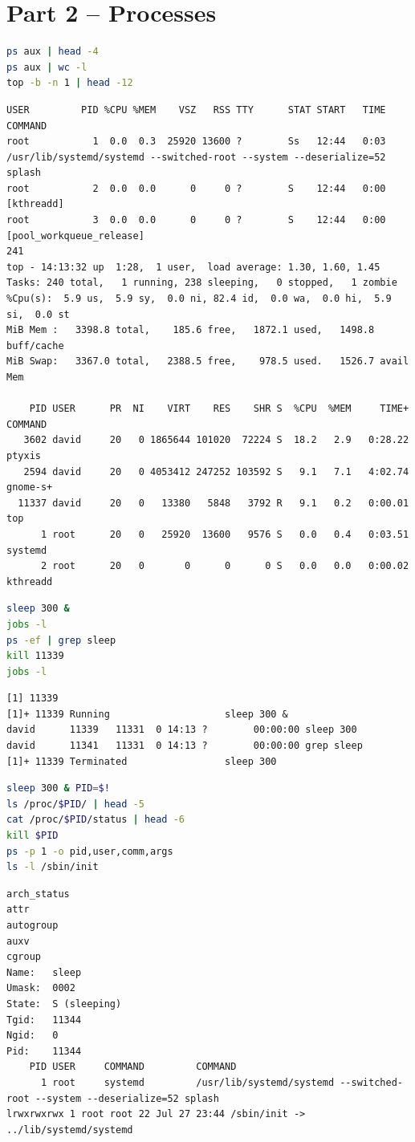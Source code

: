 \documentclass[12pt]{article}
\begin{document}
\section*{Part 2 -- Processes}
\begin{lstlisting}[language=bash]
ps aux | head -4
ps aux | wc -l
top -b -n 1 | head -12
\end{lstlisting}
\begin{lstlisting}
USER         PID %CPU %MEM    VSZ   RSS TTY      STAT START   TIME COMMAND
root           1  0.0  0.3  25920 13600 ?        Ss   12:44   0:03 /usr/lib/systemd/systemd --switched-root --system --deserialize=52 splash
root           2  0.0  0.0      0     0 ?        S    12:44   0:00 [kthreadd]
root           3  0.0  0.0      0     0 ?        S    12:44   0:00 [pool_workqueue_release]
241
top - 14:13:32 up  1:28,  1 user,  load average: 1.30, 1.60, 1.45
Tasks: 240 total,   1 running, 238 sleeping,   0 stopped,   1 zombie
%Cpu(s):  5.9 us,  5.9 sy,  0.0 ni, 82.4 id,  0.0 wa,  0.0 hi,  5.9 si,  0.0 st
MiB Mem :   3398.8 total,    185.6 free,   1872.1 used,   1498.8 buff/cache
MiB Swap:   3367.0 total,   2388.5 free,    978.5 used.   1526.7 avail Mem

    PID USER      PR  NI    VIRT    RES    SHR S  %CPU  %MEM     TIME+ COMMAND
   3602 david     20   0 1865644 101020  72224 S  18.2   2.9   0:28.22 ptyxis
   2594 david     20   0 4053412 247252 103592 S   9.1   7.1   4:02.74 gnome-s+
  11337 david     20   0   13380   5848   3792 R   9.1   0.2   0:00.01 top
      1 root      20   0   25920  13600   9576 S   0.0   0.4   0:03.51 systemd
      2 root      20   0       0      0      0 S   0.0   0.0   0:00.02 kthreadd
\end{lstlisting}

\begin{lstlisting}[language=bash]
sleep 300 &
jobs -l
ps -ef | grep sleep
kill 11339
jobs -l
\end{lstlisting}
\begin{lstlisting}
[1] 11339
[1]+ 11339 Running                    sleep 300 &
david      11339   11331  0 14:13 ?        00:00:00 sleep 300
david      11341   11331  0 14:13 ?        00:00:00 grep sleep
[1]+ 11339 Terminated                 sleep 300
\end{lstlisting}

\begin{lstlisting}[language=bash]
sleep 300 & PID=$!
ls /proc/$PID/ | head -5
cat /proc/$PID/status | head -6
kill $PID
ps -p 1 -o pid,user,comm,args
ls -l /sbin/init
\end{lstlisting}
\begin{lstlisting}
arch_status
attr
autogroup
auxv
cgroup
Name:	sleep
Umask:	0002
State:	S (sleeping)
Tgid:	11344
Ngid:	0
Pid:	11344
    PID USER     COMMAND         COMMAND
      1 root     systemd         /usr/lib/systemd/systemd --switched-root --system --deserialize=52 splash
lrwxrwxrwx 1 root root 22 Jul 27 23:44 /sbin/init -> ../lib/systemd/systemd
\end{lstlisting}
\end{document}
